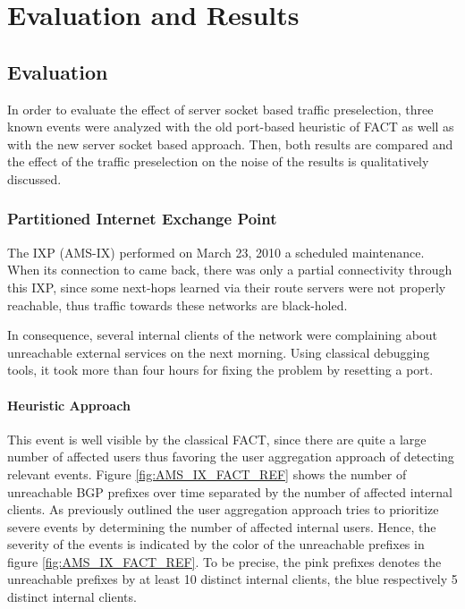 

\chapter{Evaluation and Results\label{chapter:results}}

\section{Evaluation}

In order to evaluate the effect of server socket based traffic preselection, three known events were analyzed with the old port-based heuristic of FACT as well as with the new server socket based approach. Then, both results are compared and the effect of the traffic preselection on the noise of the results is qualitatively discussed.

\subsection{Partitioned Internet Exchange Point}

The IXP \citet{AMS-IX}(AMS-IX) performed on March 23, 2010 a scheduled maintenance. When its connection to \citet{switch} came back, there was only a partial connectivity through this IXP, since some next-hops learned via their route servers were not properly reachable, thus traffic towards these networks are black-holed.\citep{SchatzmannPAM2011}

In consequence, several internal clients of the \citet{switch} network were complaining about unreachable external services on the next morning. Using classical debugging tools, it took more than four hours for fixing the problem by resetting a port.\citep{SchatzmannPAM2011}

\subsubsection{Heuristic Approach}
This event is well visible by the classical FACT, since there are quite a large number of affected users thus favoring the user aggregation approach of detecting relevant events. Figure \ref{fig:AMS_IX_FACT_REF} shows the number of unreachable BGP prefixes over time separated by the number of affected internal clients. As previously outlined the user aggregation approach tries to prioritize severe events by determining the number of affected internal users. Hence, the severity of the events is indicated by the color of the unreachable prefixes in figure \ref{fig:AMS_IX_FACT_REF}. To be precise, the pink prefixes denotes the unreachable prefixes by at least 10 distinct internal clients, the blue respectively 5 distinct internal clients.

